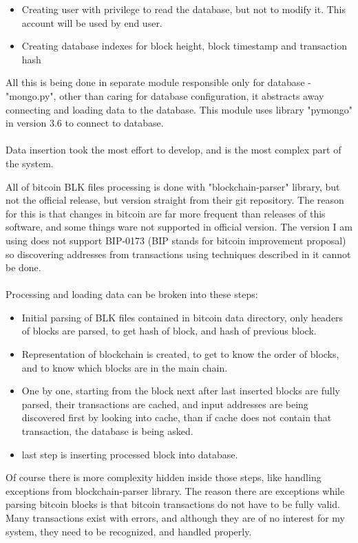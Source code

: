 \documentclass[12pt, en, eng, oneside]{mgr}
\begin{document}
\begin{itemize}
\item
Creating user with privilege to read the database, but not to modify it. This account will be used by end user.
\item
Creating database indexes for block height, block timestamp and transaction hash
\end{itemize}

All this is being done in separate module responsible only for database - "mongo.py", other than caring for database configuration, it abstracts away connecting and loading data to the database. This module uses library "pymongo" in version 3.6 to connect to database.
\\
\\  
Data insertion took the most effort to develop, and is the most complex part of the system.

All of bitcoin BLK files processing is done with "blockchain-parser" library, but not the official release, but version straight from their git repository. The reason for this is that changes in bitcoin are far more frequent than releases of this software, and some things ware not supported in official version. The version I am using does not support BIP-0173 (BIP stands for bitcoin improvement proposal) so discovering addresses from transactions using techniques described in it cannot be done. 
\\
\\
Processing and loading data can be broken into these steps:
\begin{itemize}
\item
Initial parsing of BLK files contained in bitcoin data directory, only headers of blocks are parsed, to get hash of block, and hash of previous block.
\item
Representation of blockchain is created, to get to know the order of blocks, and to know which blocks are in the main chain.
\item
One by one, starting from the block next after last inserted blocks are fully parsed, their transactions are cached, and input addresses are being discovered first by looking into cache, than if cache does not contain that transaction, the database is being asked.
\item
last step is inserting processed block into database.
\end{itemize}

Of course there is more complexity hidden inside those steps, like handling exceptions from blockchain-parser library. The reason there are exceptions while parsing bitcoin blocks is that bitcoin transactions do not have to be fully valid. Many transactions exist with errors, and although they are of no interest for my system, they need to be recognized, and handled properly.
\end{document}
